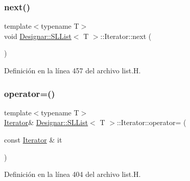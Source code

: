 \mbox{\label{class_designar_1_1_s_l_list_1_1_iterator_a37eb6d2f01ce3e41785512742cab0fbc}} 
\subsubsection{\texorpdfstring{next()}{next()}}
{\footnotesize\ttfamily template$<$typename T$>$ \\
void \hyperlink{class_designar_1_1_s_l_list}{Designar\+::\+S\+L\+List}$<$ T $>$\+::Iterator\+::next (\begin{DoxyParamCaption}{ }\end{DoxyParamCaption})\hspace{0.3cm}{\ttfamily [inline]}}



Definición en la línea 457 del archivo list.\+H.

\mbox{\label{class_designar_1_1_s_l_list_1_1_iterator_ab6a8bedc6dc57d1255464d4ea942bdf5}} 
\subsubsection{\texorpdfstring{operator=()}{operator=()}\hspace{0.1cm}{\footnotesize\ttfamily [1/2]}}
{\footnotesize\ttfamily template$<$typename T$>$ \\
\hyperlink{class_designar_1_1_s_l_list_1_1_iterator}{Iterator}\& \hyperlink{class_designar_1_1_s_l_list}{Designar\+::\+S\+L\+List}$<$ T $>$\+::Iterator\+::operator= (\begin{DoxyParamCaption}\item[{const \hyperlink{class_designar_1_1_s_l_list_1_1_iterator}{Iterator} \&}]{it }\end{DoxyParamCaption})\hspace{0.3cm}{\ttfamily [inline]}}



Definición en la línea 404 del archivo list.\+H.

